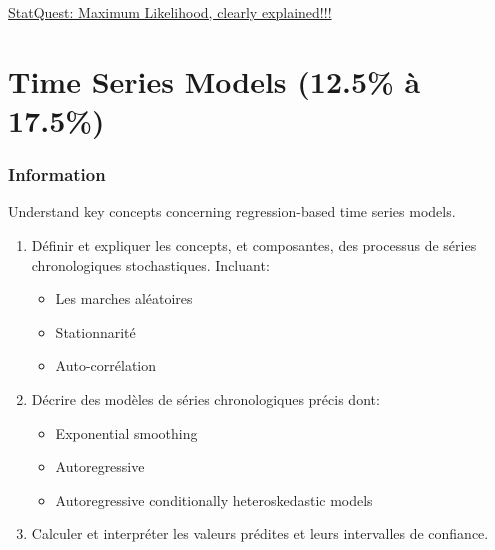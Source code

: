 \documentclass[12pt, titlepage, french]{report}
\begin{document}
\begin{YTB_SUMM}{\href{https://www.youtube.com/watch?v=XepXtl9YKwc&feature=youtu.be}{StatQuest: Maximum Likelihood, clearly explained!!!}}
\end{YTB_SUMM}

\newpage

\chapter[Time Series Models]{Time Series Models (12.5\% à 17.5\%)}

\subsection{Information}

\begin{distributions}[Objective]
Understand key concepts concerning regression-based time series models.
\end{distributions}

\begin{outcomes}
\begin{enumerate}
	\item	Définir et expliquer les concepts, et composantes, des processus de séries chronologiques stochastiques. Incluant:
	\begin{itemize}
		\item	Les marches aléatoires
		\item	Stationnarité
		\item	Auto-corrélation
	\end{itemize}
	\item	Décrire des modèles de séries chronologiques précis dont:
	\begin{itemize}
		\item	Exponential smoothing
		\item	Autoregressive
		\item	Autoregressive conditionally heteroskedastic models
	\end{itemize}
	\item	Calculer et interpréter les valeurs prédites et leurs intervalles de confiance.
\end{enumerate}
\end{outcomes}
\end{document}
